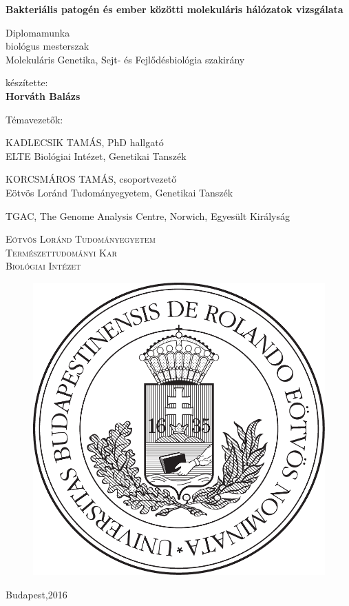 \documentclass[a4paper,12pt]{article}
\newcommand{\thesistitle}[1]{

	\vspace{48pt}
	\textbf{\noindent \huge {#1}}
	\vspace{24pt}

}
\newcommand{\spec}[1]{

		\Large Diplomamunka \\
		\large biológus mesterszak \\
		\large {#1} szakirány
		\vspace{48pt}
}
\newcommand{\name}[1]{
	\large{készítette:} \\
	\Large\textbf{{#1}}
	\vspace{84pt}
	

}
\newcommand{\consulent}[3]{
	\large{#1}, {#2} \\
	\large{{#3}}
}
\newcommand{\footer}[1]{

	\textsc{Eötvös Loránd Tudományegyetem}\\
	\textsc{Természettudományi Kar}\\
	\textsc{Biológiai Intézet} \\
	
	\begin{figure}[H]
		\centering
		\includegraphics[scale=0.35]{img/elte_cimer_vector.pdf}
	\end{figure}
	
	Budapest,#1


}
\begin{document}
	\thispagestyle{empty}
	
	\begin{center}
			\thesistitle{Bakteriális patogén és ember közötti molekuláris hálózatok vizsgálata}
			
			\spec{Molekuláris Genetika, Sejt- és Fejlődésbiológia}
			
			\name{Horváth Balázs}
			
			\large Témavezetők:
			\vspace{0.21cm}
			
			\consulent{KADLECSIK TAMÁS}{PhD hallgató}{ELTE Biológiai Intézet, Genetikai Tanszék}
			
			\vspace{16pt}
			
			\consulent{KORCSMÁROS TAMÁS}{csoportvezető}{Eötvös Loránd Tudományegyetem, Genetikai Tanszék}
			\large TGAC, The Genome Analysis Centre, Norwich, Egyesült Királyság
			
			\vspace{38pt}
			
			\footer{2016}
			
	\end{center}

	
\end{document}
